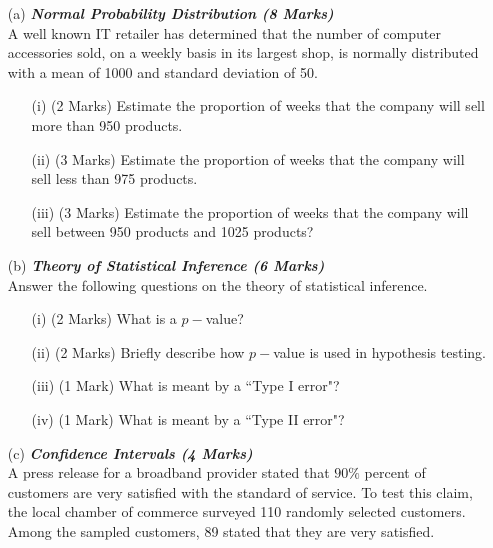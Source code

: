 \documentclass[a4paper,12pt]{article}
\begin{document}


\begin{itemize}
\item[(a)] \textbf{\textit{Normal Probability Distribution (8 Marks)}}\\
A well known IT retailer has determined that the number of computer accessories sold, on a weekly basis in its largest shop, is normally distributed with a mean of 1000 and standard deviation of 50.
\begin{itemize}
\item[(i)] (2 Marks) Estimate the proportion of weeks that the company will sell more than 950 products.

\item[(ii)] (3 Marks) Estimate the proportion of weeks that the company will sell less than 975 products.
\item[(iii)] (3 Marks) Estimate the proportion of weeks that the company will sell between 950
products and 1025 products?
\end{itemize}

\item[(b)] \textbf{\textit{Theory of Statistical Inference (6 Marks)}}\\Answer the following questions on the theory of statistical inference.
\begin{itemize}
\item[(i)] (2 Marks) What is a $p-$value?
\item[(ii)] (2 Marks) Briefly describe how $p-$value is used in hypothesis testing.
\item[(iii)] (1 Mark) What is meant by a ``Type I error"?
\item[(iv)] (1 Mark) What is meant by a ``Type II error"?
\end{itemize}
\bigskip

\item[(c)] \textbf{\textit{Confidence Intervals (4 Marks)}}\\
A press release for a broadband provider stated that $90\%$ percent of customers are very satisfied
with the standard of service. To test this claim, the local chamber of commerce surveyed 110 randomly selected customers. Among the sampled customers, 89 stated that they are very satisfied.






\end{itemize}
\end{document}
